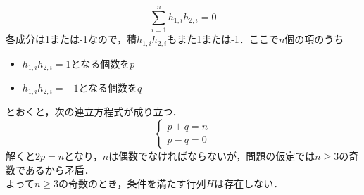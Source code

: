 \begin{souanswer}
\begin{enumerate}
\begin{equation*}
	\sum_{i= 1}^n h_{1, i}h_{2, i}= 0
\end{equation*}
	各成分は1または-1なので，積$h_{1, i}h_{2, i}$もまた1または-1．ここで$n$個の項のうち
\begin{itemize}
	\item $h_{1, i}h_{2, i}= 1$となる個数を$p$
	\item $h_{1, i}h_{2, i}= -1$となる個数を$q$
\end{itemize}
	とおくと，次の連立方程式が成り立つ．
\begin{equation*}
\begin{cases}
	p+ q= n\\
	p- q= 0
\end{cases}
\end{equation*}
	解くと$2p= n$となり，$n$は偶数でなければならないが，問題の仮定では$n\ge 3$の奇数であるから矛盾．\\
	よって$n\ge 3$の奇数のとき，条件を満たす行列$H$は存在しない．
\end{enumerate}
\end{souanswer}